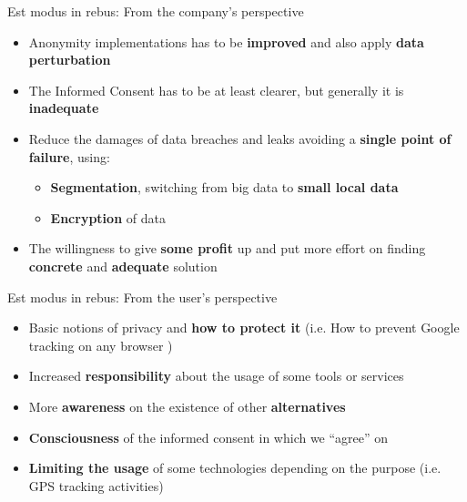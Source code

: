 \documentclass[11pt, british]{beamer}
\begin{document}
		\begin{frame}{Est modus in rebus: From the company's perspective}
				\begin{itemize}
					\item Anonymity implementations has to be \textbf{improved} 
					and also 
					apply \textbf{data perturbation}
					\item The Informed Consent has to be at least clearer, but 
					generally it is \textbf{inadequate}
					\item Reduce the damages of data breaches and leaks 
					avoiding a \textbf{single point of failure}, using:
					\begin{itemize}
						\item \textbf{Segmentation}, switching from big data to 
						\textbf{small local data} 
						\item \textbf{Encryption} of data
					\end{itemize}
					\item The willingness to give \textbf{some profit} up and 
					put more effort on finding \textbf{concrete} and 
					\textbf{adequate} solution
				\end{itemize}
		\end{frame}
			
		\begin{frame}{Est modus in rebus: From the user's perspective}
				\begin{itemize}
					\item Basic notions of privacy and \textbf{how to protect 
					it} (i.e. How to prevent Google tracking on any browser 
					\parencite{4})
					\item Increased \textbf{responsibility} about the usage of 
					some tools or services
					\item More \textbf{awareness} on the existence of other 
					\textbf{alternatives}
					\item \textbf{Consciousness} of the informed consent in 
					which we “agree” on
					\item \textbf{Limiting the usage} of some technologies 
					depending on the purpose (i.e. GPS tracking activities)
				\end{itemize}
		\end{frame}
		
\end{document}
